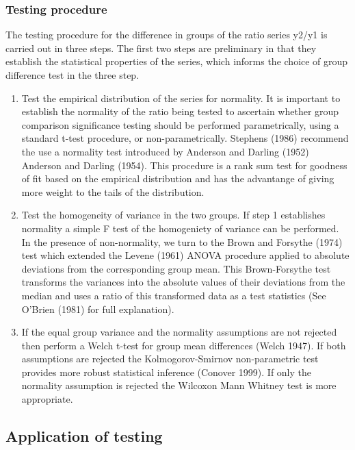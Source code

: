 \documentclass[
  10pt,
]{article}
\begin{document}
\hypertarget{TestSteps}{%
\subsubsection{Testing procedure}\label{TestSteps}}

The testing procedure for the difference in groups of the ratio series
y2/y1 is carried out in three steps. The first two steps are preliminary
in that they establish the statistical properties of the series, which
informs the choice of group difference test in the three step.

\begin{enumerate}
\def\labelenumi{\arabic{enumi}.}
\item
  Test the empirical distribution of the series for normality. It is
  important to establish the normality of the ratio being tested to
  ascertain whether group comparison significance testing should be
  performed parametrically, using a standard t-test procedure, or
  non-parametrically. Stephens (1986) recommend the use a normality test
  introduced by Anderson and Darling (1952) Anderson and Darling (1954).
  This procedure is a rank sum test for goodness of fit based on the
  empirical distribution and has the advantange of giving more weight to
  the tails of the distribution.
\item
  Test the homogeneity of variance in the two groups. If step 1
  establishes normality a simple F test of the homogeniety of variance
  can be performed. In the presence of non-normality, we turn to the
  Brown and Forsythe (1974) test which extended the Levene (1961) ANOVA
  procedure applied to absolute deviations from the corresponding group
  mean. This Brown-Forsythe test transforms the variances into the
  absolute values of their deviations from the median and uses a ratio
  of this transformed data as a test statistics (See O'Brien (1981) for
  full explanation).
\item
  If the equal group variance and the normality assumptions are not
  rejected then perform a Welch t-test for group mean differences (Welch
  1947). If both assumptions are rejected the Kolmogorov-Smirnov
  non-parametric test provides more robust statistical inference
  (Conover 1999). If only the normality assumption is rejected the
  Wilcoxon Mann Whitney test is more appropriate.
\end{enumerate}

\hypertarget{application-of-testing}{%
\subsection{Application of testing}\label{application-of-testing}}
\end{document}
